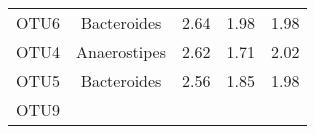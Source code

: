 \documentclass[12pt,]{article}
\begin{document}
\begin{longtable}[]{@{}ccccc@{}}
\begin{minipage}[t]{0.07\columnwidth}\centering\strut
OTU6\strut
\end{minipage} & \begin{minipage}[t]{0.18\columnwidth}\centering\strut
Bacteroides\strut
\end{minipage} & \begin{minipage}[t]{0.17\columnwidth}\centering\strut
2.64\strut
\end{minipage} & \begin{minipage}[t]{0.25\columnwidth}\centering\strut
1.98\strut
\end{minipage} & \begin{minipage}[t]{0.19\columnwidth}\centering\strut
1.98\strut
\end{minipage}\tabularnewline
\begin{minipage}[t]{0.07\columnwidth}\centering\strut
OTU4\strut
\end{minipage} & \begin{minipage}[t]{0.18\columnwidth}\centering\strut
Anaerostipes\strut
\end{minipage} & \begin{minipage}[t]{0.17\columnwidth}\centering\strut
2.62\strut
\end{minipage} & \begin{minipage}[t]{0.25\columnwidth}\centering\strut
1.71\strut
\end{minipage} & \begin{minipage}[t]{0.19\columnwidth}\centering\strut
2.02\strut
\end{minipage}\tabularnewline
\begin{minipage}[t]{0.07\columnwidth}\centering\strut
OTU5\strut
\end{minipage} & \begin{minipage}[t]{0.18\columnwidth}\centering\strut
Bacteroides\strut
\end{minipage} & \begin{minipage}[t]{0.17\columnwidth}\centering\strut
2.56\strut
\end{minipage} & \begin{minipage}[t]{0.25\columnwidth}\centering\strut
1.85\strut
\end{minipage} & \begin{minipage}[t]{0.19\columnwidth}\centering\strut
1.98\strut
\end{minipage}\tabularnewline
\begin{minipage}[t]{0.07\columnwidth}\centering\strut
OTU9\strut
\end{minipage} & \begin{minipage}[t]{0.18\columnwidth}\centering\strut

\end{minipage}
\end{longtable}
\end{document}
